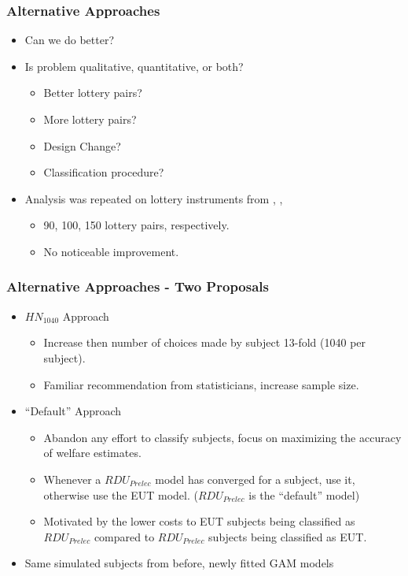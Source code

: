 \documentclass{beamer}
\begin{document}
\begin{frame}
\frametitle{Alternative Approaches}
\begin{itemize}
	\item Can we do better?
	\item Is problem qualitative, quantitative, or both?
		\begin{itemize}
			\item Better lottery pairs?
			\item More lottery pairs?
			\item Design Change?
			\item Classification procedure?
		\end{itemize}
	\item Analysis was repeated on lottery instruments from \textcite{Hey1994}, \textcite{Loomes2002}, \textcite{Schmidt2004}
		\begin{itemize}
			\item 90, 100, 150 lottery pairs, respectively.
			\item No noticeable improvement.
		\end{itemize}
\end{itemize}
\end{frame}

\begin{frame}
\frametitle{Alternative Approaches - Two Proposals}
\begin{itemize}
	\item ${HN}_{1040}$ Approach
		\begin{itemize}
			\item Increase then number of choices made by subject 13-fold (1040 per subject).
			\item Familiar recommendation from statisticians, increase sample size.
		\end{itemize}
	\item \enquote{Default} Approach
		\begin{itemize}
			\item Abandon any effort to classify subjects, focus on maximizing the accuracy of welfare estimates.
			\item Whenever a $\mathit{RDU_{Prelec}}$ model has converged for a subject, use it, otherwise use the EUT model. ($\mathit{RDU_{Prelec}}$ is the \enquote{default} model)
			\item Motivated by the lower costs to EUT subjects being classified as $\mathit{RDU_{Prelec}}$ compared to $\mathit{RDU_{Prelec}}$ subjects being classified as EUT.
		\end{itemize}
	\item Same simulated subjects from before, newly fitted GAM models
\end{itemize}
\end{frame}
\end{document}
